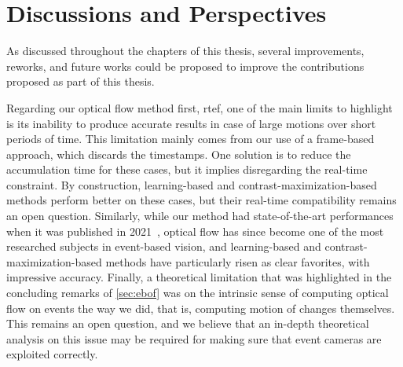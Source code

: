 \section{Discussions and Perspectives}\label{sec:conclusion:perspectives}
As discussed throughout the chapters of this thesis, several improvements, reworks, and future works could be proposed to improve the contributions proposed as part of this thesis.

Regarding our optical flow method first, \acrshort{rtef}, one of the main limits to highlight is its inability to produce accurate results in case of large motions over short periods of time. This limitation mainly comes from our use of a frame-based approach, which discards the timestamps. One solution is to reduce the accumulation time for these cases, but it implies disregarding the real-time constraint. By construction, learning-based and contrast-maximization-based methods perform better on these cases, but their real-time compatibility remains an open question. Similarly, while our method had state-of-the-art performances when it was published in 2021~\cite{Brebion2022RealTimeOF}, optical flow has since become one of the most researched subjects in event-based vision, and learning-based and contrast-maximization-based methods have particularly risen as clear favorites, with impressive accuracy. Finally, a theoretical limitation that was highlighted in the concluding remarks of \cref{sec:ebof} was on the intrinsic sense of computing optical flow on events the way we did, that is, computing motion of changes themselves. This remains an open question, and we believe that an in-depth theoretical analysis on this issue may be required for making sure that event cameras are exploited correctly.


